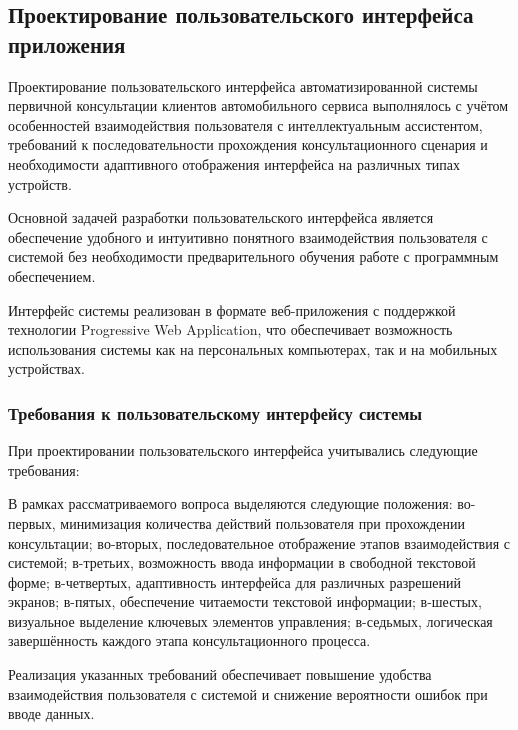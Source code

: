 \documentclass[14pt,a4paper]{extarticle}
\numberwithin{figure}{section}
\numberwithin{table}{section}
\begin{document}
\subsection{Проектирование пользовательского интерфейса
приложения}\label{ux43fux440ux43eux435ux43aux442ux438ux440ux43eux432ux430ux43dux438ux435-ux43fux43eux43bux44cux437ux43eux432ux430ux442ux435ux43bux44cux441ux43aux43eux433ux43e-ux438ux43dux442ux435ux440ux444ux435ux439ux441ux430-ux43fux440ux438ux43bux43eux436ux435ux43dux438ux44f}

Проектирование пользовательского интерфейса автоматизированной системы
первичной консультации клиентов автомобильного сервиса выполнялось с
учётом особенностей взаимодействия пользователя с интеллектуальным
ассистентом, требований к последовательности прохождения
консультационного сценария и необходимости адаптивного отображения
интерфейса на различных типах устройств.

Основной задачей разработки пользовательского интерфейса является
обеспечение удобного и интуитивно понятного взаимодействия пользователя
с системой без необходимости предварительного обучения работе с
программным обеспечением.

Интерфейс системы реализован в формате веб-приложения с поддержкой
технологии Progressive Web Application, что обеспечивает возможность
использования системы как на персональных компьютерах, так и на
мобильных устройствах.

\subsubsection{Требования к пользовательскому интерфейсу системы}

При проектировании пользовательского интерфейса учитывались следующие
требования:


В рамках рассматриваемого вопроса выделяются следующие положения: во-первых, минимизация количества действий пользователя при прохождении консультации; во-вторых, последовательное отображение этапов взаимодействия с системой; в-третьих, возможность ввода информации в свободной текстовой форме; в-четвертых, адаптивность интерфейса для различных разрешений экранов; в-пятых, обеспечение читаемости текстовой информации; в-шестых, визуальное выделение ключевых элементов управления; в-седьмых, логическая завершённость каждого этапа консультационного процесса.


Реализация указанных требований обеспечивает повышение удобства
взаимодействия пользователя с системой и снижение вероятности ошибок при
вводе данных.
\end{document}
